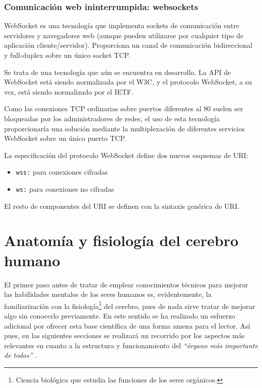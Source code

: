 \subsubsection*{Comunicación web ininterrumpida: websockets}

WebSocket es una tecnología que implementa sockets de comunicación entre servidores y navegadores web (aunque pueden utilizarse por cualquier tipo de aplicación cliente/servidor). Proporciona un canal de comunicación bidireccional y full-duplex sobre un único socket TCP.

Se trata de una tecnología que aún se encuentra en desarrollo. La API de WebSocket está siendo normalizada por el W3C, y el protocolo WebSocket, a su vez, está siendo normalizado por el IETF.

Como las conexiones TCP ordinarias sobre puertos diferentes al 80 suelen ser bloqueadas por los administradores de redes, el uso de esta tecnología proporcionaría una solución mediante la multiplexación de diferentes servicios WebSocket sobre un único puerto TCP.

La especificación del protocolo WebSocket define dos nuevos esquemas de URI:

\begin{itemize}
\item {\tt wss:} para conexiones cifradas
\item {\tt ws:} para conexiones no cifradas
\end{itemize}

El resto de componentes del URI se definen con la sintaxis genérica de URI.

\section{Anatomía y fisiología del cerebro humano}
\label{sec::fisiologia}


El primer paso antes de tratar de emplear conocimientos técnicos para mejorar las habilidades mentales de los seres humanos es, evidentemente, la familiarización con la fisiología\footnote{Ciencia biológica que estudia las funciones de los seres orgánicos.} del cerebro, pues de nada sirve tratar de mejorar algo sin conocerlo previamente. En este sentido se ha realizado un esfuerzo adicional por ofrecer esta base científica de una forma amena para el lector. Así pues, en las siguientes secciones se realizará un recorrido por los aspectos más relevantes en cuanto a la estructura y funcionamiento del {\it ``órgano más importante de todos''} \cite{Jacyna2009}.

